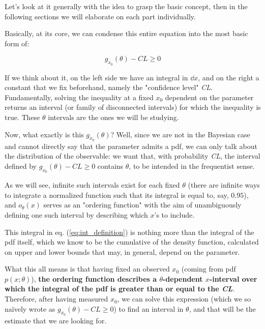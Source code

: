 Let's look at it generally with the idea to grasp the basic concept, then in the following sections we will elaborate on each part individually.

Basically, at its core, we can condense this entire equation into the most basic form of:

	\[
	g_{x_0}(\theta) - CL \geq 0
	\]

If we think about it, on the left side we have an integral in $\dd x$, and on the right a constant that we fix beforehand, namely the "confidence level" \emph{CL}. Fundamentally, solving the inequality at a fixed $x_0$ dependent on the parameter returns an interval (or family of disconnected intervals) for which the inequality is true. These $\theta$ intervals are the ones we will be studying.

Now, what exactly is this $g_{x_0}(\theta)$? Well, since we are not in the Bayesian case and cannot directly say that the parameter admits a pdf, we can only talk about the distribution of the observable: we want that, with probability \emph{CL}, the interval defined by $g_{x_0}(\theta) - CL \geq 0$ contains $\theta$, to be intended in the frequentist sense. 

As we will see, infinite such intervals exist for each fixed $\theta$ (there are infinite ways to integrate a normalized function such that its integral is equal to, say, $0.95$), and $o_{\theta}(x)$ serves as an "ordering function" with the aim of unambiguously defining one such interval by describing which $x$'s to include. 

This integral in eq. (\ref{eq:int_definition}) is nothing more than the integral of the pdf itself, which we know to be the cumulative of the density function, calculated on upper and lower bounds that may, in general, depend on the parameter. 

What this all means is that having fixed an observed $x_0$ (coming from pdf $p(x;\theta)$), \textbf{the ordering function describes a $\theta$-dependent $x$-interval over which the integral of the pdf is greater than or equal to the \emph{CL}}. Therefore, after having measured $x_0$, we can solve this expression (which we so naïvely wrote as $g_{x_0}(\theta) - CL \geq 0$) to find an interval in $\theta$, and that will be the estimate that we are looking for. 

